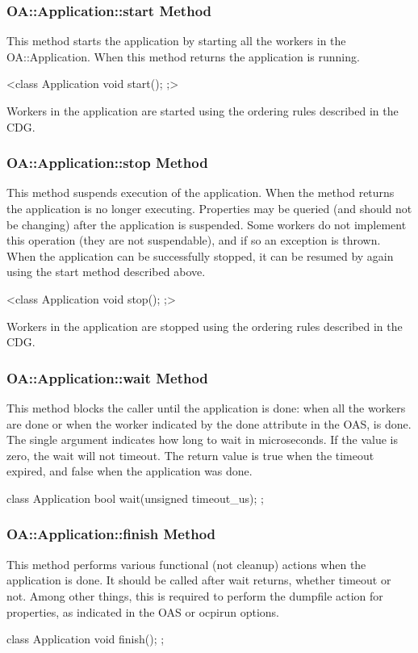 \documentclass[10pt, a4paper, oneside]{article}
\renewcommand\_{\textunderscore\allowbreak} %
\begin{document}
\subsubsection{OA::Application::start Method} This method starts the application by starting all the workers in the OA::Application. When this method returns the application is running.\begin{ocpixml}
  <class Application {
  void start();
  };> \end{ocpixml}Workers in the application are started using the ordering rules described in the CDG.
\subsubsection{OA::Application::stop Method} This method suspends execution of the application. When the method returns the application is no longer executing.  Properties may be queried (and should not be changing) after the application is suspended.  Some workers do not implement this operation (they are not suspendable), and if so an exception is thrown.  When the application can be successfully stopped, it can be resumed by again using the start method described above.\begin{ocpixml}  
<class Application {
    void stop();
  };>  \end{ocpixml}Workers in the application are stopped using the ordering rules described in the CDG.
\subsubsection{OA::Application::wait Method} This method blocks the caller until the application is done:  when all the workers are done or when the worker indicated by the done attribute in the OAS, is done.  The single argument indicates how long to wait in microseconds.  If the value is zero, the wait will not timeout.  The return value is true when the timeout expired, and false when the application was done.  \begin{ocpixml}
  class Application {
  bool wait(unsigned timeout_us);
  };  \end{ocpixml}
\subsubsection{OA::Application::finish Method} This method performs various functional (not cleanup) actions when the application is done.  It should be called after wait returns, whether timeout or not.  Among other things, this is required to perform the dumpfile action for properties, as indicated in the OAS or ocpirun options.\begin{ocpixml}class Application{
void finish();
};\end{ocpixml}
\end{document}
